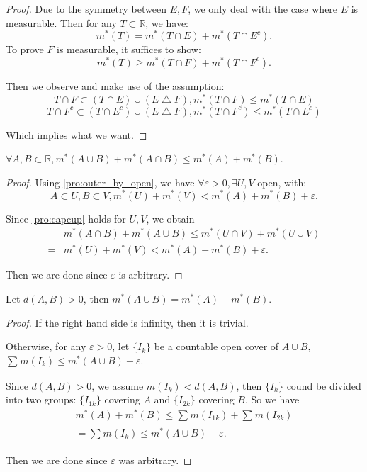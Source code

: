 \begin{proof}
	Due to the symmetry between $ E,F $, we only deal with the case 
    where $ E $ is measurable.
	Then for any $ T\subset \mathbb{R}  $, we have:
	$$
		m^*( T ) = m^*(T\cap E) + m^*(T\cap E^c).
    $$
	To prove $ F $ is measurable, it suffices to show:
	$$
		m^*( T ) \ge m^*( T\cap F ) +m^*( T\cap F^c ).
	$$

	Then we observe and make use of the assumption:
	$$
		T\cap F\subset ( T\cap E ) \cup ( E\bigtriangleup F ) ,
		m^*( T\cap F ) \le m^*( T\cap E )
	$$
	$$
		T\cap F^c\subset ( T\cap E^c ) \cup ( E\bigtriangleup F ) ,
		m^*( T\cap F^c ) \le m^*( T\cap E^c )
	$$

	Which implies what we want.
\end{proof}

\begin{problem}
$ \forall A,B\subset \mathbb{R} ,
	m^*( A\cup B ) +m^*( A\cap B )
	\le m^*( A ) +m^*( B ).
$
\end{problem}

\begin{proof}
	Using \ref{pro:outer_by_open}, we have $ \forall \varepsilon >0 ,\exists U,V $ open, with:
	$$ A\subset U,B\subset V,m^*(U)+m^*(V)<m^*( A ) +m^*( B )+\varepsilon.
	$$

	Since \ref{pro:capcup} holds for $ U,V $, we obtain
	\begin{align*}
		  & m^*( A\cap B ) +m^*( A\cup B ) \le m^*( U\cap V ) +m^*( U\cup V ) \\
		= & m^*( U ) +m^*( V ) <m^*( A ) +m^*( B )+\varepsilon.
	\end{align*}

	Then we are done since $ \varepsilon $ is arbitrary.
\end{proof}

\begin{problem}
Let $ d(A,B)>0 $, then $ m^{*}(A\cup B)=m^{*}(A)+m^{*}(B) $.
\end{problem}

\begin{proof}
	If the right hand side is infinity, then it is trivial.

	Otherwise, for any $ \varepsilon>0 $,
	let $ \{I_{k}\} $ be a countable open cover of $ A\cup B $,
	$\sum_{}^{}{m( I_k ) \le m^*( A\cup B ) +\varepsilon} $.

	Since $ d(A,B)>0 $, we assume $ m(I_{k})<d(A,B) $,
	then $ \{I_{k}\} $ cound be divided into two groups:
	$ \{I_{1k}\} $ covering $ A $ and $ \{I_{2k}\} $ covering $ B $. So we have
	\begin{gather*}
		m^*( A ) +m^*( B ) \le \sum_{}^{}{m( I_{1k} )}+\sum_{}^{}{m( I_{2k} )}
		\\
		=\sum_{}^{}{m( I_k )}\le m^*( A\cup B ) +\varepsilon.
	\end{gather*}

	Then we are done since $ \varepsilon $ was arbitrary.
\end{proof}

